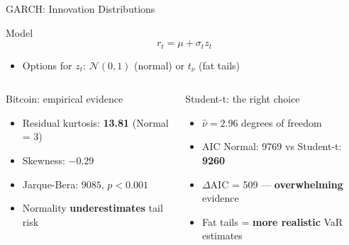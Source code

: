 \documentclass[9pt, aspectratio=169, t]{beamer}
\begin{document}
\begin{frame}{GARCH: Innovation Distributions}
    \vspace{-0.2cm}
    \begin{block}{Model}
        \vspace{-0.2cm}
        \[
        r_t = \mu + \sigma_t z_t
        \]
        \begin{itemize}\setlength{\itemsep}{0pt}
            \item Options for $z_t$: $\mathcal{N}(0,1)$ (normal) or $t_{\nu}$ (fat tails)
        \end{itemize}
    \end{block}

    \vspace{-0.1cm}

    \begin{columns}[T]
        \begin{alertblock}{Bitcoin: empirical evidence}
            \begin{itemize}\setlength{\itemsep}{0pt}
                \item Residual kurtosis: \textbf{13.81} (Normal = 3)
                \item Skewness: $-0.29$
                \item Jarque-Bera: $9085$, $p < 0.001$
                \item Normality \textbf{underestimates} tail risk
            \end{itemize}
        \end{alertblock}

        \begin{exampleblock}{Student-t: the right choice}
            \begin{itemize}\setlength{\itemsep}{0pt}
                \item $\hat{\nu} = 2.96$ degrees of freedom
                \item AIC Normal: 9769 vs Student-t: \textbf{9260}
                \item $\Delta$AIC = 509 --- \textbf{overwhelming} evidence
                \item Fat tails = \textbf{more realistic} VaR estimates
            \end{itemize}
        \end{exampleblock}
    \end{columns}
\end{frame}

\end{document}
